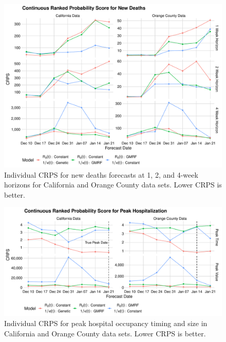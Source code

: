 \begin{figure}
    \centering
    \includegraphics[width=1.0\columnwidth]{real_data_crps_comparison_data_new_deaths_plot}
    \caption{Individual CRPS for new deaths forecasts at 1, 2, and 4-week horizons for California and Orange County data sets. Lower CRPS is better.}
    \label{ch_5:fig:real_data_crps_comparison_data_new_deaths_plot}
\end{figure}

\begin{figure}
    \centering
    \includegraphics[width=1.0\columnwidth]{real_data_peak_crps_plot}
    \caption[Individual CRPS for peak hospital occupancy in real data sets.]{Individual CRPS for peak hospital occupancy timing and size in California and Orange County data sets. Lower CRPS is better.}
    \label{ch_5:fig:real_data_peak_crps_plot}
\end{figure}

\label{ch_5:sec:real_cases_icu_death}